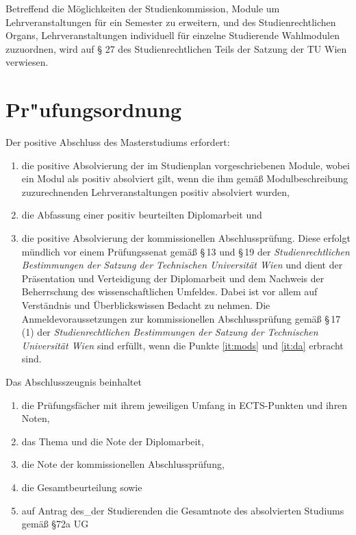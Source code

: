 Betreffend die Möglichkeiten der Studienkommission, Module um 
Lehrveranstaltungen für ein Semester zu erweitern, und des 
Studienrechtlichen Organs, Lehrveranstaltungen individuell für 
einzelne Studierende Wahlmodulen zuzuordnen, wird auf § 27 
des Studienrechtlichen Teils der Satzung der TU Wien verwiesen.

\section{Pr"ufungsordnung}\label{sec:PO}

Der positive Abschluss des Masterstudiums erfordert:
\begin{enumerate}
\item \label{it:mods} die positive Absolvierung der im
  Studienplan vorgeschriebenen Module, wobei ein Modul als positiv
  absolviert gilt, wenn die ihm gemäß Modulbeschreibung zuzurechnenden
  Lehrveranstaltungen positiv absolviert wurden,
\item \label{it:da} die Abfassung einer positiv beurteilten Diplomarbeit%
   und
\item die positive Absolvierung der kommissionellen
  Abschlussprüfung. Diese erfolgt mündlich vor einem Prüfungssenat
  gemäß \S\,13 und \S\,19 der \emph{Studienrechtlichen Bestimmungen
  der Satzung der Technischen Universität Wien} und dient der
  Präsentation und Verteidigung der Diplomarbeit und dem Nachweis der
  Beherrschung des wissenschaftlichen Umfeldes. Dabei ist vor allem
  auf Verständnis und Überblickswissen Bedacht zu nehmen. Die
  Anmelde\-voraussetzungen zur kommissionellen Abschlussprüfung gemäß
  \S\,17\,(1) der \emph{Studienrechtlichen Bestimmungen der Satzung
  der Technischen Universität Wien} sind erfüllt, wenn die Punkte
  \ref{it:mods} und \ref{it:da} erbracht sind.
\end{enumerate}
Das Abschlusszeugnis beinhaltet
\begin{enumerate}[label=(\alph*)]
\item \label{it:pfs} die Prüfungsfächer mit ihrem jeweiligen Umfang in
  ECTS-Punkten und ihren Noten,
\item das Thema und die Note der Diplomarbeit,
\item die Note der kommissionellen Abschlussprüfung,
\item die Gesamtbeurteilung sowie 
\item auf Antrag des\_der Studierenden die Gesamtnote des absolvierten 
Studiums gemäß §72a UG%
%
\end{enumerate}
